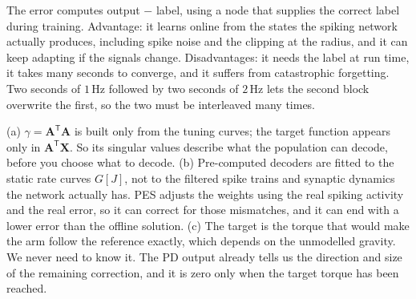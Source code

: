 \documentclass[11pt,letterpaper]{article}
\newcommand{\T}{\mathsf{T}}
\newcommand{\ans}[1]{\par\vspace{4pt}{\bfseries #1}\quad}
\begin{document}
\ans{Q3}
\begin{center}
\end{center}
The error computes output $-$ label, using a node that supplies the correct label during training. Advantage: it learns online from the states the spiking network actually produces, including spike noise and the clipping at the radius, and it can keep adapting if the signals change. Disadvantages: it needs the label at run time, it takes many seconds to converge, and it suffers from catastrophic forgetting. Two seconds of $1\,\mathrm{Hz}$ followed by two seconds of $2\,\mathrm{Hz}$ lets the second block overwrite the first, so the two must be interleaved many times.

\ans{Q4}
(a) $\gamma = \mathbf A^\T\mathbf A$ is built only from the tuning curves; the target function appears only in $\mathbf A^\T\mathbf X$. So its singular values describe what the population can decode, before you choose what to decode.
(b) Pre-computed decoders are fitted to the static rate curves $G[J]$, not to the filtered spike trains and synaptic dynamics the network actually has. PES adjusts the weights using the real spiking activity and the real error, so it can correct for those mismatches, and it can end with a lower error than the offline solution.
(c) The target is the torque that would make the arm follow the reference exactly, which depends on the unmodelled gravity. We never need to know it. The PD output already tells us the direction and size of the remaining correction, and it is zero only when the target torque has been reached.
\end{document}
